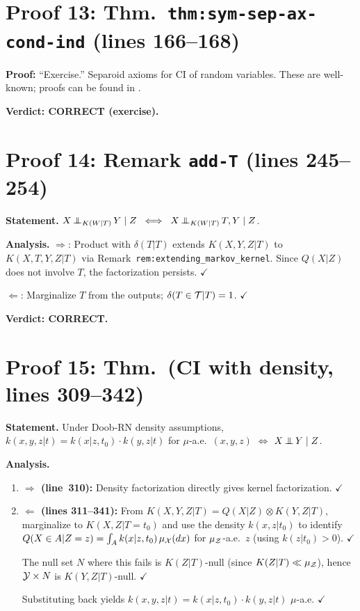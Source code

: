 \documentclass{article}
\begin{document}
\section{Proof 13: Thm.\ \texttt{thm:sym-sep-ax-cond-ind} (lines 166--168)}
\textbf{Proof:} ``Exercise.'' Separoid axioms for CI of random variables.  These are
well-known; proofs can be found in \cite{Daw01}.

\textbf{Verdict: CORRECT (exercise).}

\section{Proof 14: Remark \texttt{add-T} (lines 245--254)}

\textbf{Statement.}
$X \operatorname*{\perp\mkern-11mu\perp}_{K(W|T)} Y \mid Z \;\iff\; X \operatorname*{\perp\mkern-11mu\perp}_{K(W|T)} T,Y \mid Z$.

\textbf{Analysis.}
$\Rightarrow$: Product with $\delta(T|T)$ extends $K(X,Y,Z|T)$ to $K(X,T,Y,Z|T)$
via Remark~\texttt{rem:extending\_markov\_kernel}.  Since $Q(X|Z)$ does not
involve $T$, the factorization persists.  $\checkmark$

$\Leftarrow$: Marginalize $T$ from the outputs; $\delta(T\in\mathcal{T}|T)=1$.  $\checkmark$

\textbf{Verdict: CORRECT.}

\section{Proof 15: Thm.\ (CI with density, lines 309--342)}

\textbf{Statement.} Under Doob-RN density assumptions,
$k(x,y,z|t)=k(x|z,t_0)\cdot k(y,z|t)$ for $\mu$-a.e.\ $(x,y,z)$
$\iff$ $X\operatorname*{\perp\mkern-11mu\perp} Y\mid Z$.

\textbf{Analysis.}
\begin{enumerate}[leftmargin=*]
  \item \textbf{$\Rightarrow$ (line~310):} Density factorization directly gives kernel
    factorization.  $\checkmark$
  \item \textbf{$\Leftarrow$ (lines 311--341):}
    From $K(X,Y,Z|T)=Q(X|Z)\otimes K(Y,Z|T)$, marginalize to $K(X,Z|T=t_0)$
    and use the density $k(x,z|t_0)$ to identify $Q(X\in A|Z=z)=\int_A k(x|z,t_0)\,\mu_{\mathcal{X}}(dx)$
    for $\mu_{\mathcal{Z}}$-a.e.~$z$ (using $k(z|t_0)>0$).  $\checkmark$

    The null set $N$ where this fails is $K(Z|T)$-null (since $K(Z|T)\ll\mu_{\mathcal{Z}}$),
    hence $\mathcal{Y}\times N$ is $K(Y,Z|T)$-null.  $\checkmark$

    Substituting back yields $k(x,y,z|t)=k(x|z,t_0)\cdot k(y,z|t)$ $\mu$-a.e.  $\checkmark$
\end{enumerate}
\end{document}
